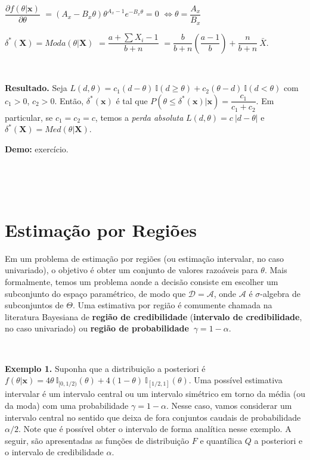 \documentclass[
]{book}
\begin{document}
\(\dfrac{\partial f(\theta|\boldsymbol x)}{\partial \theta}\) \(=(A_x-B_x\theta)\theta^{A_x-1}e^{-B_x\theta}=0\) \(\Leftrightarrow \theta =\dfrac{A_x}{B_x}\)

\({\delta}^*(\boldsymbol X) = Moda(\theta|\boldsymbol X)\) \(=\dfrac{a+\sum X_i-1}{b+n}\) \(=\dfrac{b}{b+n}\left(\dfrac{a-1}{b}\right)+\dfrac{n}{b+n}~\bar{X}\).

\(~\)

\textbf{Resultado.} Seja \(L(d,\theta)=c_1(d-\theta)~\mathbb{I}(d\geq \theta)+c_2(\theta-d)~\mathbb{I}(d<\theta)\) com \(c_1>0\), \(c_2 >0\). Então, \({\delta}^*(\boldsymbol{x})\) é tal que \(P\left(\theta\leq {\delta}^*(\boldsymbol{x})\big|\boldsymbol x\right)=\dfrac{c_1}{c_1+c_2}\). Em particular, se \(c_1=c_2=c\), temos a \emph{perda absoluta} \(L(d,\theta)=c~|d-\theta|\) e \({\delta}^*(\boldsymbol{X})=Med(\theta|\boldsymbol X)\).

\textbf{Demo:} exercício.

\(~\)

\(~\)

\hypertarget{estimauxe7uxe3o-por-regiuxf5es}{%
\section{Estimação por Regiões}\label{estimauxe7uxe3o-por-regiuxf5es}}

Em um problema de estimação por regiões (ou estimação intervalar, no caso univariado), o objetivo é obter um conjunto de valores razoáveis para \(\theta\). Mais formalmente, temos um problema aonde a decisão consiste em escolher um subconjunto do espaço paramétrico, de modo que \(\mathcal{D}=\mathcal{A}\), onde \(\mathcal{A}\) é \(\sigma\)-algebra de subconjuntos de \(\Theta\). Uma estimativa por região é comumente chamada na literatura Bayesiana de \textbf{região de credibilidade} (\textbf{intervalo de credibilidade}, no caso univariado) ou \textbf{região de probabilidade} \(~\gamma=1-\alpha\).

\(~\)

\textbf{Exemplo 1.} Suponha que a distribuição a posteriori é \(f(\theta|\boldsymbol{x})=4\theta~\mathbb{I}_{[0,1/2)}(\theta)+4(1-\theta)~\mathbb{I}_{[1/2,1]}(\theta)\). Uma possível estimativa intervalar é um intervalo central ou um intervalo simétrico em torno da média (ou da moda) com uma probabilidade \(\gamma = 1-\alpha\). Nesse caso, vamos considerar um intervalo central no sentido que deixa de fora conjuntos caudais de probabilidade \(\alpha/2\). Note que é possível obter o intervalo de forma analítica nesse exemplo. A seguir, são apresentadas as funções de distribuição \(F\) e quantílica \(Q\) a posteriori e o intervalo de credibilidade \(\alpha\).
\end{document}
